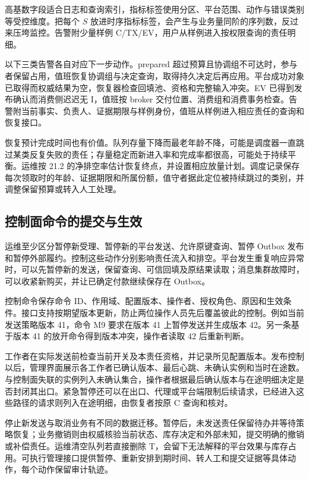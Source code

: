 高基数字段适合日志和查询索引，指标标签使用分区、平台范围、动作与错误类别等受控维度。把每个 $S$ 放进时序指标标签，会产生与业务量同阶的序列数，反过来压垮监控。告警附少量样例 C/TX/EV，用户从样例进入按权限查询的责任明细。

以下三类告警各自对应下一步动作。prepared 超过预算且协调组不可达时，参与者保留占用，值班恢复协调组与决定查询，取得持久决定后再应用。平台成功对象已取得而权威结果为空，恢复器检查回填池、资格和完整输入冲突。EV 已得到发布确认而消费侧迟迟无 I，值班按 broker 交付位置、消费组和消费事务检查。告警附当前事实、负责人、证据期限与样例身份，值班从样例进入相应责任的查询和恢复接口。

恢复预计完成时间也有价值。队列存量下降而最老年龄不降，可能是调度器一直跳过某类反复失败的责任；存量稳定而新进入率和完成率都很高，可能处于持续平衡。运维按 21.2 的净排空率估计恢复终点，并设置相应放量计划。调度记录保存每次领取时的年龄、证据期限和所属份额，值守者据此定位被持续跳过的类别，并调整保留预算或转入人工处理。

\subsection{控制面命令的提交与生效}

运维至少区分暂停新受理、暂停新的平台发送、允许原键查询、暂停 Outbox 发布和暂停外部履约。控制这些动作分别影响责任流入和排空。平台发生重复响应异常时，可以先暂停新的发送，保留查询、可信回填及原结果读取；消息集群故障时，可以收紧新购买，并让已确定付款继续保存在 Outbox。


控制命令保存命令 ID、作用域、配置版本、操作者、授权角色、原因和生效条件。接口支持按期望版本更新，防止两位操作人员先后覆盖彼此的控制。例如当前  发送策略版本 41，命令 M9 要求在版本 41 上暂停发送并生成版本 42。另一条基于版本 41 的放开命令得到版本冲突，操作者读取 42 后重新判断。

工作者在实际发送前检查当前开关及本责任资格，并记录所见配置版本。发布控制以后，管理界面展示各工作者已确认版本、最后心跳、未确认实例和当时在途数。与控制面失联的实例列入未确认集合，操作者根据最后确认版本与在途明细决定是否封闭其出口。紧急暂停还可以在出口、代理或平台端限制后续请求，已经进入这些路径的请求则列入在途明细，由恢复者按原 C 查询和核对。

停止新发送与取消业务有不同的数据迁移。暂停后，未发送责任保留待办并等待策略恢复；业务撤销则由权威核验当前状态、库存决定和外部未知，提交明确的撤销或补偿责任。运维清空队列若直接删除 T，会留下无法解释的平台效果与库存占用。可执行管理接口提供暂停、重新安排到期时间、转人工和提交证据等具体动作，每个动作保留审计轨迹。

